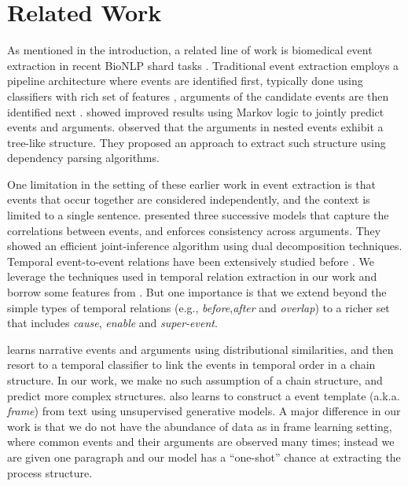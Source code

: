 \section{Related Work}
As mentioned in the introduction, a related line of work is biomedical event extraction in recent BioNLP shard tasks \cite{kim09,kim11}. 
Traditional event extraction employs a pipeline architecture where events are identified first, typically done using classifiers with rich set of features \cite{Miwa10}, arguments of the candidate events are then identified next \cite{Bjorne11}. 
 showed improved results using Markov logic to jointly predict events and arguments. 
 observed that the arguments in nested events exhibit a tree-like structure. They proposed an approach to extract such structure using dependency parsing algorithms.

One limitation in the setting of these earlier work in event extraction is that events that occur together are considered independently, and the context is limited to a single sentence.  presented three successive models that capture the correlations between events, and enforces consistency across arguments. They showed an efficient joint-inference algorithm using dual decomposition techniques. 
Temporal event-to-event relations have been extensively studied before \cite{Chambers07,Chambers08,DSouzaNg:13a}. We leverage the  techniques used in temporal relation extraction in our work and borrow some features from \cite{Chambers07}. But one importance is that we extend beyond the simple types of temporal relations (e.g., \textit{before},\textit{after} and \textit{overlap}) to a richer set that includes \textit{cause}, \textit{enable} and \textit{super-event}.

  learns narrative events and arguments using distributional similarities, and then resort to a temporal classifier to link the events in temporal order in a chain structure. In our work, we make no such assumption of a chain structure, and predict more complex structures.  also learns to construct a event template (a.k.a. \textit{frame}) from text using unsupervised generative models. A major difference in our work is that we do not have the abundance of data as in frame learning setting, where common events and their arguments are observed many times; instead we are given one paragraph and our model has a ``one-shot'' chance at extracting the process structure.
 
